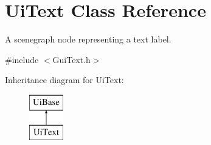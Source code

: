 \hypertarget{class_ui_text}{\section{Ui\-Text Class Reference}
\label{class_ui_text}
}


A scenegraph node representing a text label.  




{\ttfamily \#include $<$Gui\-Text.\-h$>$}

Inheritance diagram for Ui\-Text\-:\begin{figure}[H]
\begin{center}
\leavevmode
\includegraphics[height=2.000000cm]{class_ui_text}
\end{center}
\end{figure}
